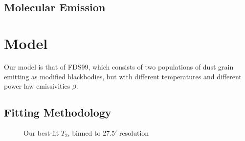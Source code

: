 \documentclass{emulateapj}
\begin{document}
\subsection{Molecular Emission}

\section{Model}
Our model is that of FDS99, which consists of two populations of dust 
grain emitting as modified blackbodies, but with different temperatures
and different power law emissivities $\beta$.


\subsection{Fitting Methodology}

\begin{figure*}[ht]
\begin{center}
\caption{Our best-fit $T_2$, binned to 27.5$'$ resolution}
\end{center}
\end{figure*}
\end{document}
